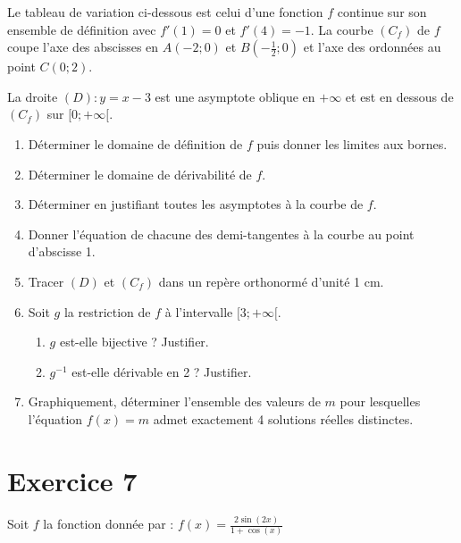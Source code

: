\documentclass[12pt]{article}
\begin{document}
Le tableau de variation ci-dessous est celui d'une fonction $f$ continue sur son ensemble de définition avec $f'(1) = 0$ et $f'(4) = -1$. La courbe $(C_f)$ de $f$ coupe l'axe des abscisses en $A(-2;0)$ et $B\left(-\frac{1}{2};0\right)$ et l'axe des ordonnées au point $C(0;2)$.

La droite $(D) : y = x - 3$ est une asymptote oblique en $+\infty$ et est en dessous de $(C_f)$ sur $[0; +\infty[$.


\begin{enumerate}
    \item Déterminer le domaine de définition de $f$ puis donner les limites aux bornes.
    \item Déterminer le domaine de dérivabilité de $f$.
    \item Déterminer en justifiant toutes les asymptotes à la courbe de $f$.
    \item Donner l'équation de chacune des demi-tangentes à la courbe au point d'abscisse 1.
    \item Tracer $(D)$ et $(C_f)$ dans un repère orthonormé d'unité 1 cm.
    \item Soit $g$ la restriction de $f$ à l'intervalle $[3; +\infty[$.
    \begin{enumerate}
        \item $g$ est-elle bijective ? Justifier.
        \item $g^{-1}$ est-elle dérivable en 2 ? Justifier.
    \end{enumerate}
    \item Graphiquement, déterminer l'ensemble des valeurs de $m$ pour lesquelles l'équation $f(x) = m$ admet exactement 4 solutions réelles distinctes.
\end{enumerate}
\section*{Exercice 7}

Soit $f$ la fonction donnée par : $f(x) = \frac{2 \sin(2x)}{1 + \cos(x)}$
\end{document}
